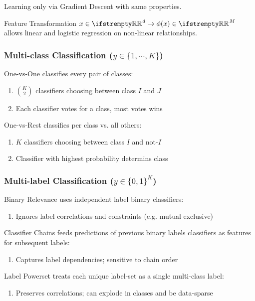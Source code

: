 \documentclass[12pt, a4paper]{article}
\begin{document}
\begin{multicols*}{3}
Learning only via Gradient Descent with same properties.

Feature Transformation $x \in \RR^d \rightarrow \phi(x) \in \RR^M$ allows linear and logistic regression on non-linear relationships.

\colbreak

\subsubsection{Multi-class Classification ($y\in \{1,\cdots,K\}$)}
One-vs-One classifies every pair of classes: 
\begin{enumerate}[\roman*.]
  \item $\binom K2$ classifiers choosing between class $I$ and $J$
  \item Each classifier votes for a class, most votes wins
\end{enumerate}

One-vs-Rest classifies per class vs. all others:
\begin{enumerate}[\roman*.]
  \item $K$ classifiers choosing between class $I$ and not-$I$
  \item Classifier with highest probability determins class
\end{enumerate}

\subsubsection{Multi-label Classification ($y\in \{0,1\}^K$)}

Binary Relevance uses independent label binary classifiers:
\begin{enumerate}[\roman*.]
  \item Ignores label correlations and constraints (e.g. mutual exclusive)
\end{enumerate}

Classifier Chains feeds predictions of previous binary labels classifiers as features for subsequent labels:
\begin{enumerate}[\roman*.]
  \item Captures label dependencies; sensitive to chain order
\end{enumerate}

Label Powerset treats each unique label-set as a single multi-class label: 
\begin{enumerate}[\roman*.]
  \item Preserves correlations; can explode in classes and be data-sparse
\end{enumerate}


\end{multicols*}
\end{document}
